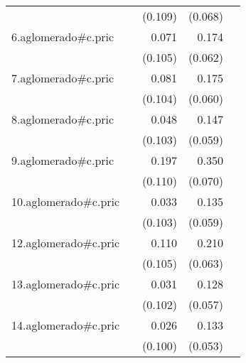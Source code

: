 {\begin{longtable}{l*{4}{D{.}{.}{-1}}}
            &                     &     (0.109)         &     (0.068)         &                     \\
\addlinespace
6.aglomerado#c.pric&                     &       0.071         &       0.174\sym{**} &                     \\
            &                     &     (0.105)         &     (0.062)         &                     \\
\addlinespace
7.aglomerado#c.pric&                     &       0.081         &       0.175\sym{**} &                     \\
            &                     &     (0.104)         &     (0.060)         &                     \\
\addlinespace
8.aglomerado#c.pric&                     &       0.048         &       0.147\sym{*}  &                     \\
            &                     &     (0.103)         &     (0.059)         &                     \\
\addlinespace
9.aglomerado#c.pric&                     &       0.197         &       0.350\sym{***}&                     \\
            &                     &     (0.110)         &     (0.070)         &                     \\
\addlinespace
10.aglomerado#c.pric&                     &       0.033         &       0.135\sym{*}  &                     \\
            &                     &     (0.103)         &     (0.059)         &                     \\
\addlinespace
12.aglomerado#c.pric&                     &       0.110         &       0.210\sym{***}&                     \\
            &                     &     (0.105)         &     (0.063)         &                     \\
\addlinespace
13.aglomerado#c.pric&                     &       0.031         &       0.128\sym{*}  &                     \\
            &                     &     (0.102)         &     (0.057)         &                     \\
\addlinespace
14.aglomerado#c.pric&                     &       0.026         &       0.133\sym{*}  &                     \\
            &                     &     (0.100)         &     (0.053)         &                     \\

\end{longtable}}
